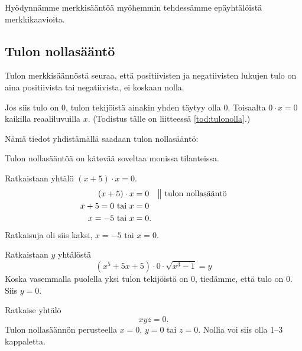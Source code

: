 Hyödynnämme merkkisääntöä myöhemmin tehdessämme epäyhtälöistä merkkikaavioita.

\subsection*{Tulon nollasääntö}

Tulon merkkisäännöstä seuraa, että positiivisten ja negatiivisten lukujen tulo on aina positiivista tai negatiivista, ei koskaan nolla.

Jos siis tulo on $0$, tulon tekijöistä ainakin yhden täytyy olla $0$. Toisaalta $0\cdot x = 0$ kaikilla reaaliluvuilla $x$.
(Todistus tälle on liitteessä \ref{tod:tulonolla}.)

Nämä tiedot yhdistämällä saadaan tulon nollasääntö:


Tulon nollasääntöä on kätevää soveltaa monissa tilanteissa.

\begin{esimerkki} Ratkaistaan yhtälö $(x+5) \cdot x =0 $.
    \begin{align*}
        (x+5)\cdot x &=0 \quad \big\| \text{ tulon nollasääntö} \\
        x +5= 0 \text{ tai } x &=0 \\
        x= -5 \text{ tai } x &=0.
    \end{align*}
    Ratkaisuja oli siis kaksi, $x= -5$ tai $x= 0$.
\end{esimerkki}


\begin{esimerkki} Ratkaistaan $y$ yhtälöstä
    \[(x^5+5x+5)\cdot 0\cdot \sqrt{x^3-1} =y\]
    Koska vasemmalla puolella yksi tulon tekijöistä on $0$, tiedämme, että tulo on $0$. Siis $y=0$.
\end{esimerkki}

\begin{esimerkki} Ratkaise yhtälö
    \[xyz=0.\]
Tulon nollasäännön perusteella $x=0$, $y=0$ tai $z=0$. Nollia voi siis
olla 1--3 kappaletta.
\end{esimerkki}

